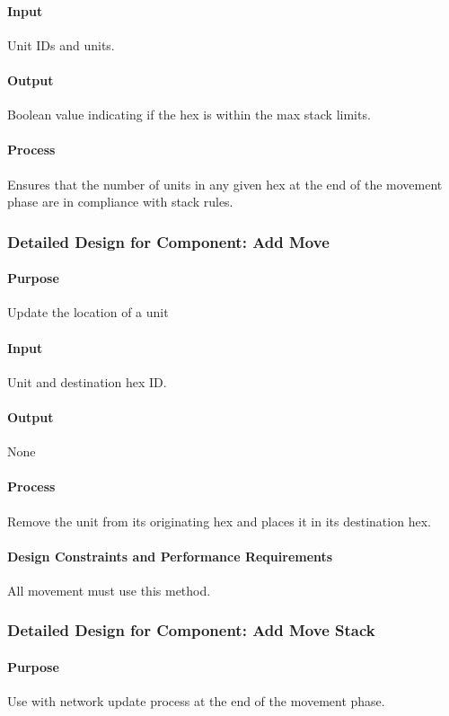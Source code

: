 \documentclass[12pt,a4paper,titlepage]{article}
\begin{document}
\paragraph{Input} Unit IDs and units. 
\paragraph{Output} Boolean value indicating if the hex is within the max stack limits.
\paragraph{Process} Ensures that the number of units in any given hex at the end of the movement phase are in compliance with stack rules.

\subsubsection{Detailed Design for Component: Add Move}
\paragraph{Purpose} Update the location of a unit
\paragraph{Input} Unit and destination hex ID.
\paragraph{Output} None
\paragraph{Process} Remove the unit from its originating hex and places it in its destination hex.
\paragraph{Design Constraints and Performance Requirements} All movement must use this method.

\subsubsection{Detailed Design for Component: Add Move Stack}
\paragraph{Purpose} Use with network update process at the end of the movement phase.
\end{document}
